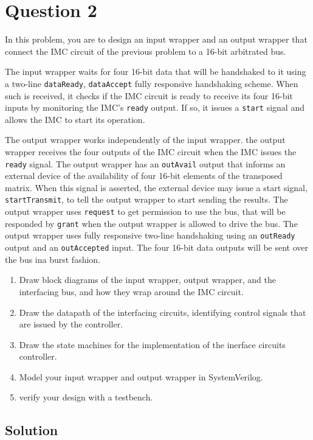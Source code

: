 \documentclass[../main.tex]{subfiles}
\begin{document}
\newpage

\section{Question 2}

In this problem, you are to design an input wrapper and an output wrapper that connect the IMC circuit of the previous problem to a 16-bit arbitrated bus.

The input wrapper waits for four 16-bit data that will be handshaked to it using a two-line \texttt{dataReady}, \texttt{dataAccept} fully responsive handshaking scheme. When such is received, it checks if the IMC circuit is ready to receive its four 16-bit inputs by monitoring the IMC's \texttt{ready} output. If so, it issues a \texttt{start} signal and allows the IMC to start its operation.

The output wrapper works independently of the input wrapper. the output wrapper receives the four outputs of the IMC circuit when the IMC issues the \texttt{ready} signal. The output wrapper has an \texttt{outAvail} output that informs an external device of the availability of four 16-bit elements of the transposed matrix. When this signal is asserted, the external device may issue a start signal, \texttt{startTransmit}, to tell the output wrapper to start sending the results. The output wrapper uses \texttt{request} to get permission to use the bus, that will be responded by \texttt{grant} when the output wrapper is allowed to drive the bus. The output wrapper uses fully responsive two-line handshaking using an \texttt{outReady} output and an \texttt{outAccepted} input. The four 16-bit data outputs will be sent over the bus ina  burst fashion.

\begin{enumerate}
    \item Draw block diagrams of the input wrapper, output wrapper, and the interfacing bus, and how they wrap around the IMC circuit.
    \item Draw the datapath of the interfacing circuits, identifying control signals that are issued by the controller.
    \item Draw the state machines for the implementation of the inerface circuits controller.
    \item Model your input wrapper and output wrapper in SystemVerilog.
    \item verify your design with a testbench.
\end{enumerate}

\subsection*{Solution}
\end{document}
